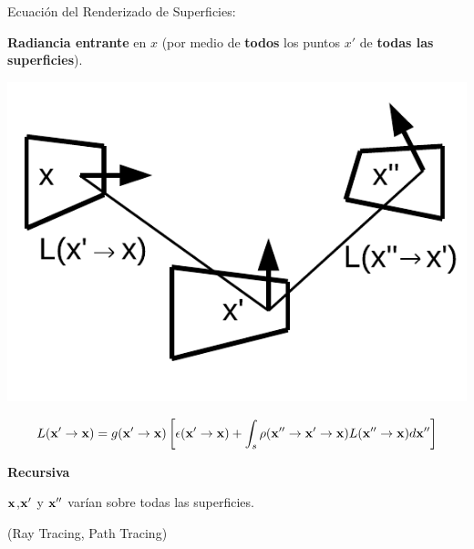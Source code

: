 \documentclass[spanish,unknownkeysallowed,10pt]{beamer}
\begin{document}
\begin{frame}{Ecuación del Renderizado de Superficies:}

\textbf{Radiancia entrante} en $x$ (por medio de \textbf{todos} los puntos $x'$ de \textbf{todas las superficies}).

\centerline{\includegraphics[scale = 0.4]{../figures/rendequation}}
\vspace{-1cm}
$$ L(\bold{x'} \rightarrow \bold{x}) =  g(\bold{x'}  \rightarrow \bold{x})  \left[ \epsilon(\bold{x'}  \rightarrow \bold{x}) + \int_{s}{\rho(\bold{x''}  \rightarrow \bold{x'}  \rightarrow \bold{x})L(\bold{x''}  \rightarrow \bold{x}) d\bold{x''}} \right] $$

\textbf{Recursiva}

$\bold{x}$,$\bold{x'}$ y $\bold{x''}$ varían sobre todas las superficies.

(Ray Tracing, Path Tracing)

\end{frame}
\end{document}
